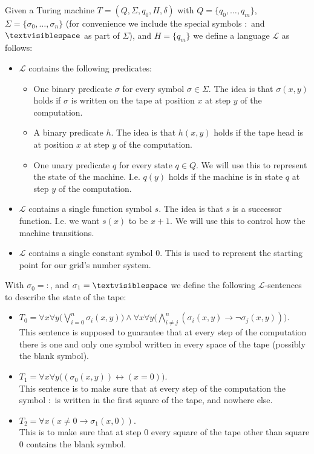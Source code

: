 \documentclass{article}
\theoremstyle{plain}
\theoremstyle{definition}
\newcommand{\tvs}{\textvisiblespace}
\newcommand{\ra}{\rightarrow}
\begin{document}
Given a Turing machine $T=(Q,\Sigma,q_0,H,\delta)$ with $Q=\{q_0,\ldots,q_m\}$, $\Sigma = \{\sigma_0,\ldots,\sigma_n\}$ (for convenience we include the special symbols $:$ and $\tvs$ as part of $\Sigma$), and $H = \{q_m\}$ we define a language $\mathscr{L}$ as follows:
\begin{itemize}
\item $\mathscr{L}$ contains the following predicates:
\begin{itemize}
\item One binary predicate $\sigma$ for every symbol $\sigma\in\Sigma$. The idea is that $\sigma(x,y)$ holds if $\sigma$ is written on the tape at position $x$ at step $y$ of the computation.
\item A binary predicate $h$. The idea is that $h(x,y)$ holds if the tape head is at position $x$ at step $y$ of the computation.
\item One unary predicate $q$ for every state $q\in Q$. We will use this to represent the state of the machine. I.e. $q(y)$ holds if the machine is in state $q$ at step $y$ of the computation.
\end{itemize}
\item $\mathscr{L}$ contains a single function symbol $s$. The idea is that $s$ is a successor function. I.e. we want $s(x)$ to be $x+1$. We will use this to control how the machine transitions.
\item $\mathscr{L}$ contains a single constant symbol $0$. This is used to represent the starting point for our grid's number system.
\end{itemize}
\noindent
With $\sigma_0= :$, and $\sigma_1=\tvs$ we define the following $\mathscr{L}$-sentences to describe the state of the tape: 
\begin{itemize}
\item $T_0=\forall x \forall y\big(\bigvee_{i=0}^n \sigma_i(x,y)\big)\wedge \forall x \forall y\big(\bigwedge_{i\neq j}^n (\sigma_i(x,y)\ra\neg \sigma_j(x,y))\big)$.\\
This sentence is supposed to guarantee that at every step of the computation there is one and only one symbol written in every space of the tape (possibly the blank symbol).
\item $T_1 = \forall x\forall y\big((\sigma_0(x,y))\leftrightarrow (x=0)\big) $.\\
This sentence is to make sure that at every step of the computation the symbol $:$ is written in the first square of the tape, and nowhere else.
\item $T_2 = \forall x (x\neq 0 \ra\sigma_1(x,0))$.\\
This is to make sure that at step 0 every square of the tape other than square 0 contains the blank symbol.
\end{itemize}
\end{document}
